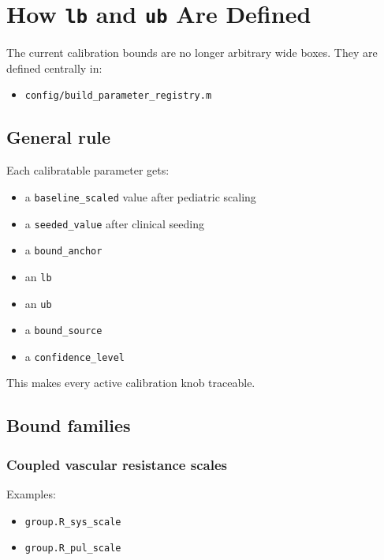 \documentclass[11pt,a4paper]{article}
\begin{document}
\section{How \texttt{lb} and \texttt{ub} Are Defined}

The current calibration bounds are no longer arbitrary wide boxes. They are
defined centrally in:

\begin{itemize}[leftmargin=1.5em]
    \item \texttt{config/build\_parameter\_registry.m}
\end{itemize}

\subsection{General rule}

Each calibratable parameter gets:

\begin{itemize}[leftmargin=1.5em]
    \item a \texttt{baseline\_scaled} value after pediatric scaling
    \item a \texttt{seeded\_value} after clinical seeding
    \item a \texttt{bound\_anchor}
    \item an \texttt{lb}
    \item an \texttt{ub}
    \item a \texttt{bound\_source}
    \item a \texttt{confidence\_level}
\end{itemize}

This makes every active calibration knob traceable.

\subsection{Bound families}

\subsubsection{Coupled vascular resistance scales}

Examples:

\begin{itemize}[leftmargin=1.5em]
    \item \texttt{group.R\_sys\_scale}
    \item \texttt{group.R\_pul\_scale}
\end{itemize}
\end{document}
